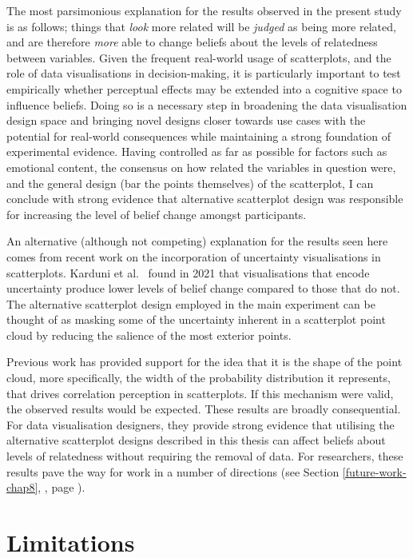 \documentclass[../main.tex]{subfiles}
\begin{document}
The most parsimonious explanation for the results observed in the
present study is as follows; things that \emph{look} more related will
be \emph{judged} as being more related, and are therefore \emph{more}
able to change beliefs about the levels of relatedness between
variables. Given the frequent real-world usage of scatterplots, and the
role of data visualisations in decision-making, it is particularly
important to test empirically whether perceptual effects may be extended
into a cognitive space to influence beliefs. Doing so is a necessary
step in broadening the data visualisation design space and bringing
novel designs closer towards use cases with the potential for real-world
consequences while maintaining a strong foundation of experimental
evidence. Having controlled as far as possible for factors such as
emotional content, the consensus on how related the variables in
question were, and the general design (bar the points themselves) of the
scatterplot, I can conclude with strong evidence that alternative
scatterplot design was responsible for increasing the level of belief
change amongst participants.

An alternative (although not competing) explanation for the results seen
here comes from recent work on the incorporation of uncertainty
visualisations in scatterplots. Karduni et al.~\cite{karduni_2021} found
in 2021 that visualisations that encode uncertainty produce lower levels
of belief change compared to those that do not. The alternative
scatterplot design employed in the main experiment can be thought of as
masking some of the uncertainty inherent in a scatterplot point cloud by
reducing the salience of the most exterior points.

Previous work has provided support for the idea that it is the shape of
the point cloud, more specifically, the width of the probability
distribution it represents, that drives correlation perception in
scatterplots. If this mechanism were valid, the observed results would
be expected. These results are broadly consequential. For data
visualisation designers, they provide strong evidence that utilising the
alternative scatterplot designs described in this thesis can affect
beliefs about levels of relatedness without requiring the removal of
data. For researchers, these results pave the way for work in a number
of directions (see Section \ref{future-work-chap8},
, page \pageref{future-work-chap8}).

\section{Limitations}\label{limitations-e5}
\end{document}
